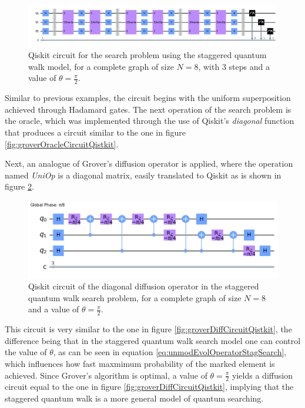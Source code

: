 \documentclass[../../dissertation.tex]{subfiles}
\begin{document}
\begin{figure}[!h]
	\centering
	\includegraphics[scale=0.35]{img/Qiskit/StaggeredQW/Search/Circuits/StagSearchCircuit_N3_M0_S3.png}
	\caption{Qiskit circuit for the search problem using the staggered quantum walk model, for a complete graph of size $N=8$, with $3$ steps and a value of $\theta = \frac{\pi}{2}$.}
	\label{fig:stagSearchCircQistkit}
\end{figure}
Similar to previous examples, the circuit begins with the uniform superposition
achieved through Hadamard gates. The next operation of the search problem is
the oracle, which was implemented through the use of Qiskit's \textit{diagonal}
function that produces a circuit similar to the one in figure
\ref{fig:groverOracleCircuitQistkit}.\par

Next, an analogue of Grover's diffusion operator is applied, where the
operation named \textit{UniOp} is a diagonal matrix, easily translated to
Qiskit as is shown in figure \ref{fig:stagSearchUniOpCircQistkit}.  
\begin{figure}[!h]
	\centering
	\includegraphics[scale=0.40]{img/Qiskit/StaggeredQW/Search/Circuits/StagUniOpCircuit_N3_M0_S3.png}
	\caption{Qiskit circuit of the  diagonal diffusion operator in the staggered quantum walk search problem, for a complete graph of size $N=8$ and a value of $\theta = \frac{\pi}{2}$.}
	\label{fig:stagSearchUniOpCircQistkit}
\end{figure}
This circuit is very similar to the one in figure
\ref{fig:groverDiffCircuitQistkit}, the difference being that in the staggered
quantum walk search model one can control the value of $\theta$, as can be seen
in equation \ref{eq:unmodEvolOperatorStagSearch}, which influences how fast
maxmimum probability of the marked element is achieved. Since Grover's
algorithm is optimal, a value of $\theta=\frac{\pi}{2}$ yields a diffusion
circuit equal to the one in figure \ref{fig:groverDiffCircuitQistkit}, implying
that the staggered quantum walk is a more general model of quantum searching.\par
\end{document}
